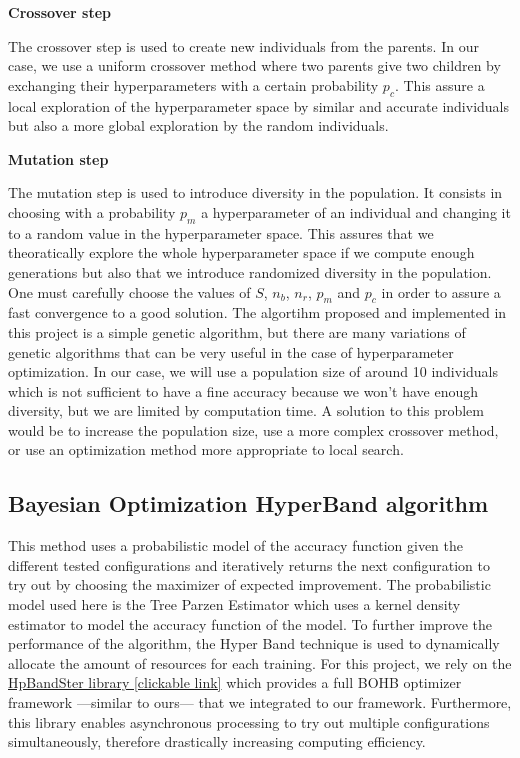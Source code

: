 \documentclass[a4 paper,11pt,2]{article}
\begin{document}
\vspace{5pt}

\textbf{Crossover step}

The crossover step is used to create new individuals from the parents. In our
case, we use a uniform crossover method where two parents give two children by
exchanging their hyperparameters with a certain probability $p_c$. This assure
a local exploration of the hyperparameter space by similar and accurate
individuals but also a more global exploration by the random individuals.

\vspace{5pt}

\textbf{Mutation step}

The mutation step is used to introduce diversity in the population. It consists
in choosing with a probability $p_m$ a hyperparameter of an individual and
changing it to a random value in the hyperparameter space. This assures that we
theoratically explore the whole hyperparameter space if we compute enough
generations but also that we introduce randomized diversity in the
population.\\

One must carefully choose the values of $S$, $n_b$, $n_r$, $p_m$ and $p_c$ in
order to assure a fast convergence to a good solution. The algortihm proposed
and implemented in this project is a simple genetic algorithm, but there are
many variations of genetic algorithms that can be very useful in the case of
hyperparameter optimization. In our case, we will use a population size of
around 10 individuals which is not sufficient to have a fine accuracy because
we won't have enough diversity, but we are limited by computation time. A
solution to this problem would be to increase the population size, use a more
complex crossover method, or use an optimization method more appropriate to
local search.

\subsection{Bayesian Optimization HyperBand algorithm \cite{falknerBOHBRobustEfficient2018}}
This method uses a probabilistic model of the accuracy function given the different tested configurations and iteratively returns the next configuration to try out by choosing the maximizer of expected improvement.  The probabilistic model used here is the Tree Parzen Estimator which uses a kernel density estimator to model the accuracy function of the model. To further improve the performance of the algorithm, the Hyper Band technique is used to dynamically allocate the amount of resources for each training. For this project, we rely on the \href{https://automl.github.io/HpBandSter/build/html/quickstart.html}{HpBandSter library [clickable link]} which provides a full BOHB optimizer framework ---similar to ours--- that we integrated to our framework. Furthermore, this library enables asynchronous processing to try out multiple configurations simultaneously, therefore drastically increasing computing efficiency.
\end{document}
